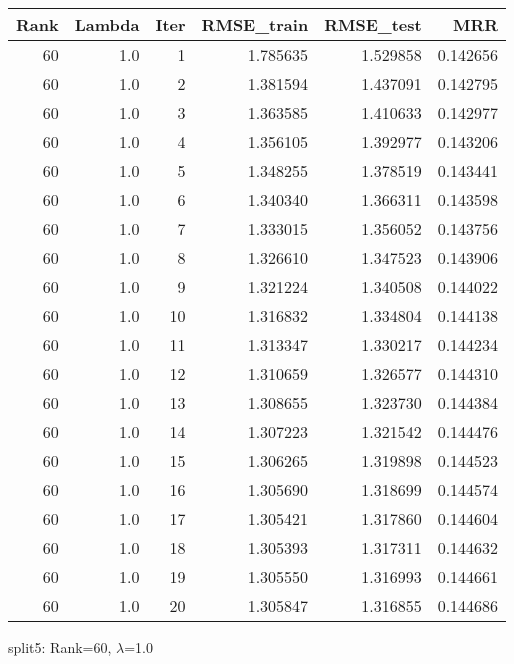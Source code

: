 \begin{tabular}{rrrrrr}
\toprule
 Rank &  Lambda &  Iter &  RMSE\_train &  RMSE\_test &       MRR \\
\midrule
   60 &     1.0 &     1 &    1.785635 &   1.529858 &  0.142656 \\
   60 &     1.0 &     2 &    1.381594 &   1.437091 &  0.142795 \\
   60 &     1.0 &     3 &    1.363585 &   1.410633 &  0.142977 \\
   60 &     1.0 &     4 &    1.356105 &   1.392977 &  0.143206 \\
   60 &     1.0 &     5 &    1.348255 &   1.378519 &  0.143441 \\
   60 &     1.0 &     6 &    1.340340 &   1.366311 &  0.143598 \\
   60 &     1.0 &     7 &    1.333015 &   1.356052 &  0.143756 \\
   60 &     1.0 &     8 &    1.326610 &   1.347523 &  0.143906 \\
   60 &     1.0 &     9 &    1.321224 &   1.340508 &  0.144022 \\
   60 &     1.0 &    10 &    1.316832 &   1.334804 &  0.144138 \\
   60 &     1.0 &    11 &    1.313347 &   1.330217 &  0.144234 \\
   60 &     1.0 &    12 &    1.310659 &   1.326577 &  0.144310 \\
   60 &     1.0 &    13 &    1.308655 &   1.323730 &  0.144384 \\
   60 &     1.0 &    14 &    1.307223 &   1.321542 &  0.144476 \\
   60 &     1.0 &    15 &    1.306265 &   1.319898 &  0.144523 \\
   60 &     1.0 &    16 &    1.305690 &   1.318699 &  0.144574 \\
   60 &     1.0 &    17 &    1.305421 &   1.317860 &  0.144604 \\
   60 &     1.0 &    18 &    1.305393 &   1.317311 &  0.144632 \\
   60 &     1.0 &    19 &    1.305550 &   1.316993 &  0.144661 \\
   60 &     1.0 &    20 &    1.305847 &   1.316855 &  0.144686 \\
\bottomrule
\end{tabular}

\caption{split5: Rank=60, $\lambda$=1.0}
